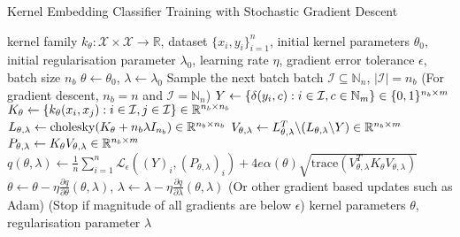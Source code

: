 \documentclass{article}
\begin{document}
	\begin{algorithm}[tb]
		\caption{Kernel Embedding Classifier Training with Stochastic Gradient Descent}
		\label{alg:kernel_embedding_classifier_training}
		\begin{algorithmic}[1]
			 kernel family $k_{\theta} : \mathcal{X} \times \mathcal{X} \to \mathbb{R}$, dataset $\{x_{i}, y_{i}\}_{i = 1}^{n}$, initial kernel parameters $\theta_{0}$, initial regularisation parameter $\lambda_{0}$, learning rate $\eta$, gradient error tolerance $\epsilon$, batch size $n_{b}$
			\STATE $\theta \leftarrow \theta_{0}$, $\lambda \leftarrow \lambda_{0}$
			\REPEAT
			\STATE Sample the next batch batch $\mathcal{I} \subseteq \mathbb{N}_{n}$, $| \mathcal{I} | = n_{b}$ \hspace{\fill} (For gradient descent, $n_{b} = n$ and $\mathcal{I} = \mathbb{N}_{n}$)
			\STATE $Y \leftarrow \{\delta(y_{i}, c) : i \in \mathcal{I}, c \in \mathbb{N}_{m}\} \hspace{\fill} \in \{0, 1\}^{n_{b} \times m}$
			\STATE $K_{\theta} \leftarrow \{k_{\theta}(x_{i}, x_{j}) : i \in \mathcal{I}, j \in \mathcal{I}\} \hspace{\fill} \in \mathbb{R}^{n_{b} \times n_{b}}$
			\STATE $L_{\theta, \lambda} \leftarrow \mathrm{cholesky}(K_{\theta} + n_{b} \lambda I_{n_{b}}) \hspace{\fill} \in \mathbb{R}^{n_{b} \times n_{b}}$
			\STATE $V_{\theta, \lambda} \leftarrow L_{\theta, \lambda}^{T} \backslash (L_{\theta, \lambda} \backslash Y) \hspace{\fill} \in \mathbb{R}^{n_{b} \times m}$
			\STATE $P_{\theta, \lambda} \leftarrow K_{\theta} V_{\theta, \lambda} \hspace{\fill} \in \mathbb{R}^{n_{b} \times m}$
			\STATE $q(\theta, \lambda) \leftarrow \frac{1}{n} \sum_{i = 1}^{n} \mathcal{L}_{\epsilon}((Y)_{i}, (P_{\theta, \lambda})_{i}) + 4 e \alpha(\theta) \sqrt{\mathrm{trace}(V_{\theta, \lambda}^{T} K_{\theta} V_{\theta, \lambda})}$ 
			\STATE $\theta \leftarrow \theta - \eta \frac{\partial q}{\partial \theta}(\theta, \lambda)$, $\lambda \leftarrow \lambda - \eta \frac{\partial q}{\partial \lambda}(\theta, \lambda)$ \hspace{\fill} (Or other gradient based updates such as Adam)
			 \hspace{\fill} (Stop if magnitude of all gradients are below $\epsilon$)
			 kernel parameters $\theta$, regularisation parameter $\lambda$
		\end{algorithmic}
	\end{algorithm}
	
\end{document}
